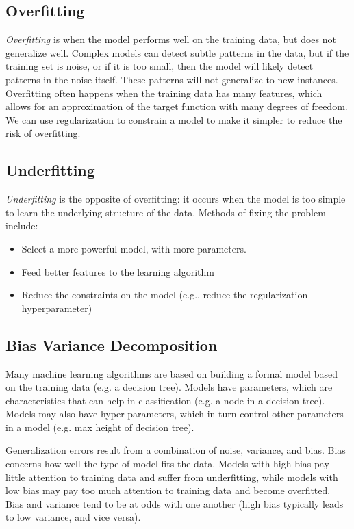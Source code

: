 \documentclass[12pt]{article}
\begin{document}
    \subsection{Overfitting} \label{sec:Overfitting}
        \textit{Overfitting} is when the model performs well on the training data, but does not generalize well. Complex
        models can detect subtle patterns in the data, but if the training set is noise, or if it is too small, then the
        model will likely detect patterns in the noise itself. These patterns will not generalize to new instances.
        Overfitting often happens when the training data has many features, which allows for an approximation of the
        target function with many degrees of freedom. We can use regularization to constrain a model to make it simpler
        to reduce the risk of overfitting.

    \subsection{Underfitting} \label{sec:Underfitting}
        \textit{Underfitting} is the opposite of overfitting: it occurs when the model is too simple to learn the
        underlying structure of the data. Methods of fixing the problem include:
        \begin{itemize}
            \item Select a more powerful model, with more parameters.
            \item Feed better features to the learning algorithm
            \item Reduce the constraints on the model (e.g., reduce the regularization hyperparameter)
        \end{itemize}

    \subsection{Bias Variance Decomposition}
        Many machine learning algorithms are based on building a formal model based on the training data (e.g. a
        decision tree). Models have parameters, which are characteristics that can help in classification (e.g. a node
        in a decision tree). Models may also have hyper-parameters, which in turn control other parameters in a model
        (e.g. max height of decision tree).

        Generalization errors result from a combination of noise, variance, and bias. Bias concerns how well the type of
        model fits the data. Models with high bias pay little attention to training data and suffer from underfitting,
        while models with low bias may pay too much attention to training data and become overfitted. Bias and variance
        tend to be at odds with one another (high bias typically leads to low variance, and vice versa).
\end{document}
